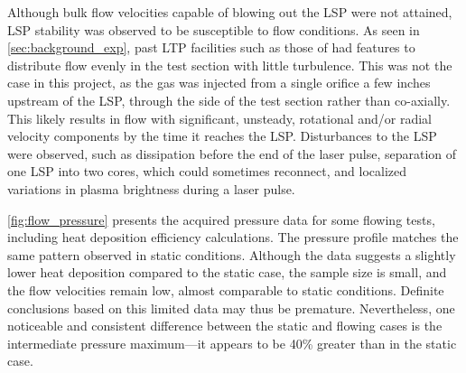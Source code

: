         Although bulk flow velocities capable of blowing out the LSP were not attained, LSP stability was observed to be susceptible to flow conditions. As seen in \autoref{sec:background_exp}, past LTP facilities such as those of \textcite{toyodaThrustPerformanceCW2002} had features to distribute flow evenly in the test section with little turbulence. This was not the case in this project, as the gas was injected from a single orifice a few inches upstream of the LSP, through the side of the test section rather than co-axially. This likely results in flow with significant, unsteady, rotational and/or radial velocity components by the time it reaches the LSP. Disturbances to the LSP were observed, such as dissipation before the end of the laser pulse, separation of one LSP into two cores, which could sometimes reconnect, and localized variations in plasma brightness during a laser pulse.

        \autoref{fig:flow_pressure} presents the acquired pressure data for some flowing tests, including heat deposition efficiency calculations. The pressure profile matches the same pattern observed in static conditions. Although the data suggests a slightly lower heat deposition compared to the static case, the sample size is small, and the flow velocities remain low, almost comparable to static conditions. Definite conclusions based on this limited data may thus be premature. Nevertheless, one noticeable and consistent difference between the static and flowing cases is the intermediate pressure maximum---it appears to be 40\% greater than in the static case. 

